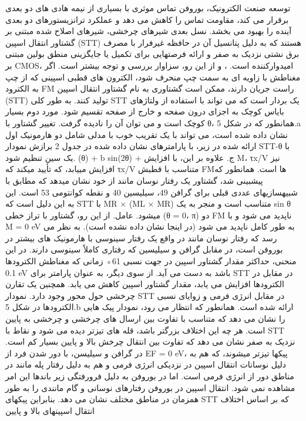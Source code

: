 توسعه صنعت الکترونیک، بوروفن تماس موثری با بسیاری از نیمه هادی های دو بعدی برقرار می کند، مقاومت تماس را کاهش می دهد و عملکرد ترانزیستورهای دو بعدی آینده را بهبود می بخشد.
نسل بعدی شیرهای چرخشی، شیرهای اصلاح شده مبتنی بر گشتاور انتقال اسپین (STT) هستند که به دلیل پتانسیل آن در حافظه غیرفرار با مصرف برق نشتی نزدیک به صفر و ارائه فرصتهایی برای تکمیل یا جایگزینی منطق بولین مبتنی بر CMOS، امیدوارکننده است. ، و از این رو، سزاوار بررسی و توجه بیشتر است. اگر مغناطش با زاویه ای به سمت چپ منحرف شود، الکترون های قطبی اسپینی که از چپ به الکترود FM راست جریان دارند، ممکن است گشتاوری به نام گشتاور انتقال اسپین (STT) تولید کنند. به طور کلی STT یک بردار است که می تواند با استفاده از ولتاژهای بایاس کوچک به اجزای درون صفحه و خارج از صفحه تقسیم شود. مورد دوم بسیار کوچک است و می توان آن را نادیده گرفت. تغییر گشتاور با θ، همانطور که در شکل 5.a نشان داده شده است، می تواند با یک تقریب خوب با مدلی شامل دو هارمونیک اول ارائه شده در زیر، با پارامترهای نشان داده شده در جدول 2 برازش نمودار STT-θ با یک سین تنظیم شود. (θ) + b sin(2θ) + ج. علاوه بر این، با افزایش M، τx/V نیز افزایش مییابد، که تأیید میکند که τx/V متناسب با قطبش FMها است. همانطور که پیشبینی شد، گشتاور یک رفتار نوسان مانند از خود نشان میدهد که مطابق با شبیهسازیهای عددی قبلی برای گرافن 49، سیلیسین 40 و نقطه کوانتومی 53 است. این به این دلیل است که STT با MR × (ML × MR) متناسب است و منجر به یک sin θ میشود. عامل. از این رو، گشتاور با تراز خطی (θ = 0، π) دو FM ناپدید می شود و با M = 0 eV به طور کامل ناپدید می شود (در اینجا نشان داده نشده است). به نظر می رسد که رفتار نوسان مانند در واقع یک رفتار سینوسی با هارمونیک های بیشتر در بوروفن است، در مقابل گرافن و سیلیسین که رفتاری کاملاً سینوسی دارند. در این منحنی، حداکثر مقدار گشتاور اسپین در جهت نسبی 61◦ زمانی که مغناطش الکترودها 0.1 eV باشد به دست می آید. از سوی دیگر، به عنوان پارامتر برای STT در مقابل در الکترودها افزایش می یابد، مقدار گشتاور اسپین کاهش می یابد. همچنین یک تقارن چرخشی حول محور وجود دارد. نمودار STT در مقابل انرژی فرمی و زوایای نسبی الکترودها در شکل 5.b ارائه شده است. همانطور که انتظار می رود، نمودار پیک هایی را نشان می دهد که متناسب با تفاوت بین ارسال های چرخشی و چرخشی به پایین است. هر چه این اختلاف بزرگتر باشد، قله های تیزتر دیده می شود و نقاط با STT نزدیک به صفر نشان می دهد که تفاوت بین انتقال چرخش بالا و پایین بسیار کم است. در گرافن و سیلیسن، با دور شدن فرد از EF = 0 eV، پیکها تیزتر میشوند، که هم به دلیل نوسانات انتقال اسپین در نزدیکی انرژی فرمی و هم به دلیل رفتار پله مانند در مناطق دور از انرژی فرمی است. اما در بوروفن به دلیل فرورفتگی زیر باندها این امر مشاهده نمی شود. انتقال اسپین در بوروفن رفتارهای نوسانی و گام مانندی را به طور همزمان در مناطق مختلف نشان می دهد. بنابراین پیکهای STT که بر اساس اختلاف انتقال اسپینهای بالا و پایین 
